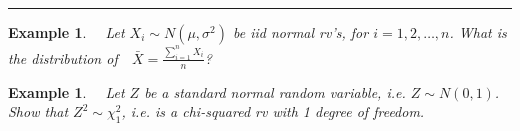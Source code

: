 \documentclass[12pt]{amsart}
\newtheorem{example}[theorem]{Example}
\newcommand\gs{\sigma}
\begin{document}
{%
\vspace{6cm}
\hrule
\vspace{.5cm}
\begin{example} \ \  Let $X_i \sim N(\mu, \gs^2)$ be iid normal rv's, for $i=1,2,\ldots,n$. \newline 
 What is the distribution of\ \  $\bar{X}=\frac{\sum_{i=1}^n X_i}{n}$?

\end{example}

\newpage

\begin{example} \ \  Let $Z$ be a standard normal random variable, i.e. $Z \sim N(0,1)$. \newline
Show that $Z^2 \sim \chi_1^2$, i.e. is a chi-squared rv with 1 degree of freedom.
\end{example}



}  %
\end{document}

